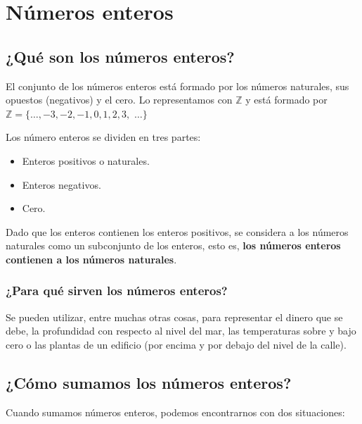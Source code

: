 \section{Números enteros}

\subsection{¿Qué son los números enteros?}

El conjunto de los números enteros está formado por los números naturales, sus opuestos (negativos) y el cero. Lo representamos con $\mathbb{Z}$ y está formado por $\mathbb{Z} = \{ \hdots, -3, -2, -1, 0, 1, 2, 3,$ $\hdots \}$

Los número enteros se dividen en tres partes:

\begin{itemize}
    \item Enteros positivos o naturales.
    \item Enteros negativos.
    \item Cero.
\end{itemize}

Dado que los enteros contienen los enteros positivos, se considera a los números naturales como un subconjunto de los enteros, esto es, \textbf{los números enteros contienen a los números naturales}.

\subsubsection{¿Para qué sirven los números enteros?}

Se pueden utilizar, entre muchas otras cosas, para representar el dinero que se debe, la profundidad con respecto al nivel del mar, las temperaturas sobre y bajo cero o las plantas de un edificio (por encima y por debajo del nivel de la calle).

\subsection{¿Cómo sumamos los números enteros?}

Cuando sumamos números enteros, podemos encontrarnos con dos situaciones:

